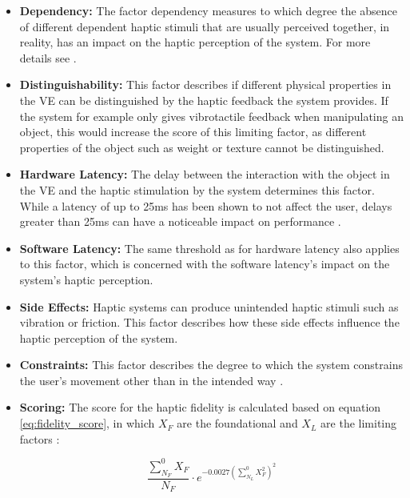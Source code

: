 \begin{itemize}
    \item \textbf{Dependency:}
    The factor dependency measures to which degree the absence of different dependent haptic stimuli that are usually perceived together, in reality, has an impact on the haptic perception of the system. For more details see \cite{Muender2022HapticReality}.
    
    \item \textbf{Distinguishability:}
    This factor describes if different physical properties in the VE can be distinguished by the haptic feedback the system provides. If the system for example only gives vibrotactile feedback when manipulating an object, this would increase the score of this limiting factor, as different properties of the object such as weight or texture cannot be distinguished. 

    \item \textbf{Hardware Latency:}
    The delay between the interaction with the object in the VE and the haptic stimulation by the system determines this factor. While a latency of up to 25ms has been shown to not affect the user, delays greater than 25ms can have a noticeable impact on performance \cite{Muender2022HapticReality}.
    
    \item \textbf{Software Latency:}
    The same threshold as for hardware latency also applies to this factor, which is concerned with the software latency's impact on the system's haptic perception.

    \item \textbf{Side Effects:}
    Haptic systems can produce unintended haptic stimuli such as vibration or friction. This factor describes how these side effects influence the haptic perception of the system. 

    \item \textbf{Constraints:}
    This factor describes the degree to which the system constrains the user's movement other than in the intended way \cite{Muender2022HapticReality}.

    \item \textbf{Scoring:}
    The score for the haptic fidelity is calculated based on equation \ref{eq:fidelity_score}, in which $X_F$ are the foundational and $X_L$ are the limiting factors \cite{Muender2022HapticReality}:

    \begin{equation}
    	\frac{\sum_{N_F}^{0} X_F}{N_F} \cdot e^{-0.0027 \left(\sum_{N_L}^{0} X_F^2 \right)^2}
    	\label{eq:fidelity_score}
    \end{equation}
    
\end{itemize}


